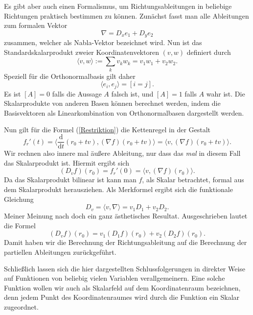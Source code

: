 \documentclass[a4paper,12pt,fleqn,dvipdfmx]{article}
\begin{document}
Es gibt aber auch einen Formalismus, um Richtungsableitungen
in beliebige Richtungen praktisch bestimmen zu können.
Zunächst fasst man alle Ableitungen zum formalen Vektor
\begin{equation}
\nabla = D_x e_1+D_y e_2
\end{equation}
zusammen, welcher als Nabla-Vektor bezeichnet wird. Nun ist das
Standardskalarprodukt zweier Koordinatenvektoren $(v,w)$ definiert
durch
\begin{equation}
\langle v,w\rangle := \sum_k v_k w_k = v_1 w_1+v_2 w_2.
\end{equation}
Speziell für die Orthonormalbasis gilt daher
\begin{equation}
\langle e_i,e_j\rangle = [i=j].
\end{equation}
Es ist $[A]=0$ falls die Aussage $A$ falsch ist, und $[A]=1$
falls $A$ wahr ist. Die Skalarprodukte von anderen Basen können
berechnet werden, indem die Basisvektoren als Linearkombination
von Orthonormalbasen dargestellt werden.

Nun gilt für die Formel (\ref{Restriktion}) die Kettenregel
in der Gestalt
\begin{equation}
f_r'(t) = \langle\frac{\mathrm d}{\mathrm dt}(r_0+tv),
(\nabla f)(r_0+tv)\rangle
= \langle v,(\nabla f)(r_0+tv)\rangle.
\end{equation}
Wir rechnen also innere mal äußere Ableitung, nur dass das
\textit{mal} in diesem Fall das Skalarprodukt ist. Hiermit ergibt
sich
\begin{equation}
(D_v f)(r_0) = f_r'(0) = \langle v,(\nabla f)(r_0)\rangle.
\end{equation}
Da das Skalarprodukt bilinear ist kann man $f$, als Skalar
betrachtet, formal aus dem Skalarprodukt herausziehen.
Als Merkformel ergibt sich die funktionale Gleichung
\begin{equation}\label{Richtungsableitung}
D_v = \langle v,\nabla\rangle = v_1D_1+v_2D_2.
\end{equation}
Meiner Meinung nach doch ein ganz ästhetisches Resultat.
Ausgeschrieben lautet die Formel
\begin{equation}\label{RAexpandiert}
(D_v f)(r_0) = v_1(D_1 f)(r_0)+ v_2(D_2 f)(r_0).
\end{equation}
Damit haben wir die Berechnung der Richtungsableitung auf
die Berechnung der partiellen Ableitungen zurückgeführt.

Schließlich lassen sich die hier dargestellten Schlussfolgerungen
in direkter Weise auf Funktionen von beliebig vielen Variablen
verallgemeinern. Eine solche Funktion wollen wir auch als Skalarfeld
auf dem Koordinatenraum bezeichnen, denn jedem Punkt des
Koordinatenraumes wird durch die Funktion ein Skalar zugeordnet.
\end{document}
